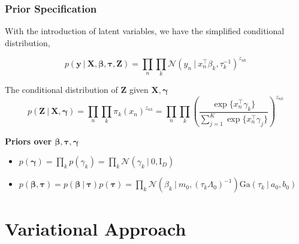 \documentclass{beamer}
\newcommand{\eye}{\mathrm{I}}
\newcommand\given[1][]{\:#1\vert\:}
\newcommand{\transpose}[1]{#1^{\intercal}}
\newcommand{\nprod}{\prod_{n}}
\newcommand{\kprod}{\prod_{k}}
\newcommand{\boldbeta}{\boldsymbol\beta}
\newcommand{\boldgamma}{\boldsymbol\gamma}
\newcommand{\boldtau}{\boldsymbol\tau}
\newcommand{\sumexp}{\sum_{j=1}^{K} \exp \{ \transpose{x_n} \gamma_j \}}
\begin{document}
\begin{frame}

\frametitle{Prior Specification}
With the introduction of latent variables, we have the simplified conditional distribution,

\begin{equation} \label{eq:conditional}
	p \left( \mathbf{y} \given \mathbf{X}, \boldsymbol\beta, \boldsymbol{\tau}, \mathbf{Z} \right) = 
	\prod_{n} \prod_{k} \mathcal{N} \left( y_n \given \transpose{x_n} \beta_k, \tau_{k}^{-1} \right)^{z_{nk}}
\end{equation}


The conditional distribution of $\mathbf{Z}$ given $\mathbf{X}, \boldgamma$
\begin{equation} \label{eq:cond_Z}
	p \left( \mathbf{Z} \given \mathbf{X}, \boldsymbol\gamma \right) = \nprod \kprod \pi_{k} (x_n)^{z_{nk}} = 
	\nprod \kprod \left( \frac{\exp\{\transpose{x_n} \gamma_k\}}{\sumexp}\right)^{z_{nk}}
\end{equation}
 
\textbf{Priors over $\boldbeta, \boldtau, \boldgamma$}
\begin{itemize}
	\item $p(\boldgamma) = \kprod p(\gamma_k) = \kprod \mathcal{N} \left( \gamma_k \given 0, \eye_D \right)$
	\item $p\left( \boldbeta, \boldtau \right) = p\left( \boldbeta \given \boldtau \right) p(\boldtau)= \kprod \mathcal{N} \left( \beta_k \given m_0, (\tau_k \Lambda_0)^{-1} \right) \mathrm{Ga} \left( \tau_k \given a_0, b_0 \right)$
\end{itemize}

\end{frame}


\section{Variational Approach}
\end{document}

